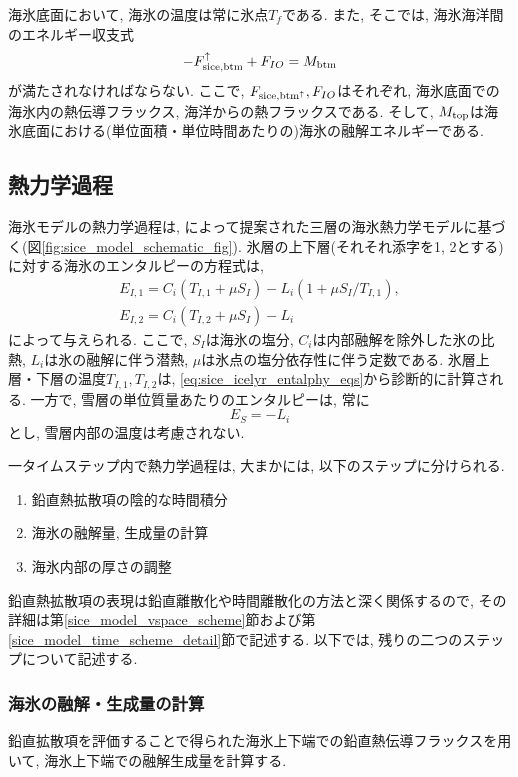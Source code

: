 海氷底面において, 海氷の温度は常に氷点$T_f$である.   
また, そこでは, 海氷海洋間のエネルギー収支式 
\begin{equation}
  - F_{\rm sice,btm}^\uparrow + F_{IO}
  = M_{\rm btm}
\label{eq:sice_model_bottom_energy_budget}
\end{equation}
が満たされなければならない. 
ここで, $F_{\rm sice,btm^\uparrow}, F_{IO}$はそれぞれ, 
海氷底面での海氷内の熱伝導フラックス, 海洋からの熱フラックスである.
そして,  $M_{\rm top}$は海氷底面における(単位面積・単位時間あたりの)海氷の融解エネルギーである. 

\subsection{熱力学過程}\label{sice_model_basic_thermodyn}
海氷モデルの熱力学過程は,
\cite{winton2000reformulated}によって提案された三層の海氷熱力学モデルに基づく(図\ref{fig:sice_model_schematic_fig}).
氷層の上下層(それそれ添字を1, 2とする)に対する海氷のエンタルピーの方程式は, 
\begin{subequations}
\begin{gather}
  E_{I,1}
  = C_i (T_{I,1} + \mu S_I) - L_i (1 + \mu S_I/T_{I,1}), \\
  E_{I,2}
  = C_i (T_{I,2} + \mu S_I) - L_i
\end{gather}
\label{eq:sice_icelyr_entalphy_eqs}
\end{subequations}
によって与えられる. 
ここで, $S_I$は海氷の塩分, 
$C_i$は内部融解を除外した氷の比熱, 
$L_i$は氷の融解に伴う潜熱, 
$\mu$は氷点の塩分依存性に伴う定数である. 
氷層上層・下層の温度$T_{I,1},T_{I,2}$は, \eqref{eq:sice_icelyr_entalphy_eqs}から診断的に計算される. 
一方で, 雪層の単位質量あたりのエンタルピーは, 常に
$$
E_{S} = -L_i
$$
とし, 雪層内部の温度は考慮されない. 

一タイムステップ内で熱力学過程は, 大まかには, 以下のステップに分けられる.
\begin{enumerate}
  \setlength{\itemsep}{-2pt}
  \item 鉛直熱拡散項の陰的な時間積分
  \item 海氷の融解量, 生成量の計算
  \item 海氷内部の厚さの調整
\end{enumerate}
鉛直熱拡散項の表現は鉛直離散化や時間離散化の方法と深く関係するので,
その詳細は第\ref{sice_model_vspace_scheme}節および第\ref{sice_model_time_scheme_detail}節で記述する.
以下では, 残りの二つのステップについて記述する. 

\subsubsection*{海氷の融解・生成量の計算}
鉛直拡散項を評価することで得られた海氷上下端での鉛直熱伝導フラックスを用いて, 
海氷上下端での融解生成量を計算する. 

